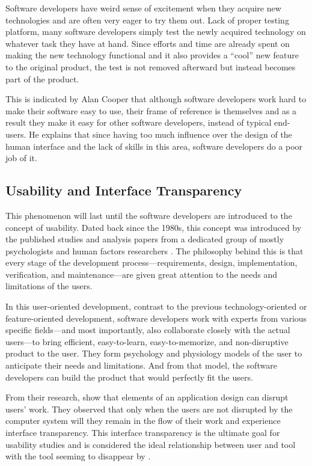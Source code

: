 \documentclass{acm_proc_article-sp}
\begin{document}
Software developers have weird sense of excitement when they acquire
new technologies and are often very eager to try them out. Lack of
proper testing platform, many software developers simply test the newly
acquired technology on whatever task they have at hand. Since efforts
and time are already spent on making the new technology functional and
it also provides a ``cool'' new feature to the original product, the
test is not removed afterward but instead becomes part of the product.

This is indicated by Alan Cooper \citeyearpar{inmates:cooper} that
although software developers work hard to make their software easy to
use, their frame of reference is themselves and as a result they make
it easy for other software developers, instead of typical end-users. He
explains that since having too much influence over the design of the
human interface and the lack of skills in this area, software
developers do a poor job of it.

\subsection{Usability and Interface Transparency}
This phenomenon will last until the software developers are introduced
to the concept of usability. Dated back since the 1980s, this concept
was introduced by the published studies and analysis papers from a
dedicated group of mostly psychologists and human factors researchers
\citep{human:rubinstein, friendly:simpson, human:shneiderman,
  human:brown, software:dumas}. The philosophy behind this is that
every stage of the development process---requirements, design,
implementation, verification, and maintenance---are given great
attention to the needs and limitations of the users.

In this user-oriented development, contrast to the previous
technology-oriented or feature-oriented development, software
developers work with experts from various specific fields---and most
importantly, also collaborate closely with the actual users---to bring
efficient, easy-to-learn, easy-to-memorize, and non-disruptive product
to the user. They form psychology and physiology models of the user to
anticipate their needs and limitations. And from that model, the
software developers can build the product that would perfectly fit the
users.

From their research, \citet{transparency:holtzblatt} show that
elements of an application design can disrupt users' work. They
observed that only when the users are not disrupted by the computer
system will they remain in the flow of their work and experience
interface transparency. This interface transparency is the ultimate
goal for usability studies and is considered the ideal relationship
between user and tool with the tool seeming to disappear by
\citet{transparency:rutkoski}.
\end{document}
